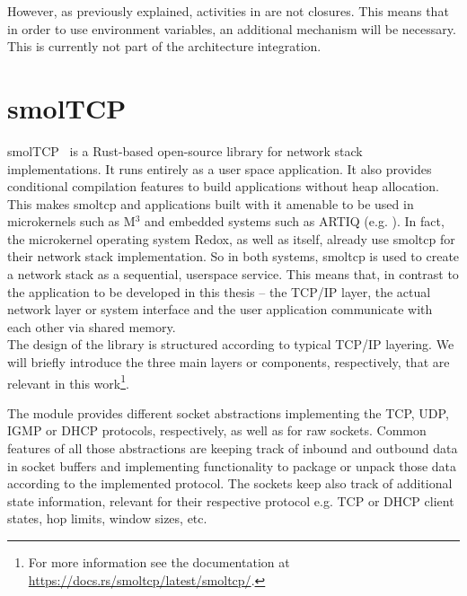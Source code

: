 However, as previously explained, activities in \md are not closures. This means that in order to use environment variables, an additional mechanism will be necessary. This is currently not part of the architecture integration.

\section{smolTCP}
smolTCP~\cite{smolTCP} is a Rust-based open-source library for network stack implementations. It runs entirely as a user space application. It also provides conditional compilation features to build applications without heap allocation. This makes smoltcp and applications built with it amenable to be used in microkernels such as M$^3$\cite{Asmussen:M3v} and embedded systems such as ARTIQ (e.g. \cite{lam2021combining}). In fact, the microkernel operating system Redox\cite{redoxwebsite}, as well as \md itself, already use smoltcp for their network stack implementation. So in both systems, smoltcp is used to create a network stack as a sequential, userspace service. This means that, in contrast to the application to be developed in this thesis -- the TCP/IP layer, the actual network layer or system interface and the user application communicate with each other via shared memory. \\

The design of the library is structured according to typical TCP/IP layering. We will briefly introduce the three main layers or components, respectively, that are relevant in this work\footnote{For more information see the documentation at \url{https://docs.rs/smoltcp/latest/smoltcp/}.}.


The  module provides different socket abstractions implementing the TCP, UDP, IGMP or DHCP protocols, respectively, as well as for raw sockets. Common features of all those abstractions are keeping track of inbound and outbound data in socket buffers and implementing functionality to package or unpack those data according to the implemented protocol. The sockets keep also track of additional state information, relevant for their respective protocol e.g. TCP or DHCP client states, hop limits, window sizes, etc.\\


